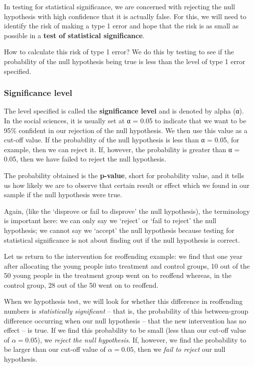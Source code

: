 \documentclass[
]{book}
\begin{document}
In testing for statistical significance, we are concerned with rejecting the null hypothesis with high confidence that it is actually false. For this, we will need to identify the risk of making a type 1 error and hope that the risk is as small as possible in a \textbf{test of statistical significance}.

How to calculate this risk of type 1 error? We do this by testing to see if the probability of the null hypothesis being true is less than the level of type 1 error specified.

\hypertarget{significance-level}{%
\subsubsection{Significance level}\label{significance-level}}

The level specified is called the \textbf{significance level} and is denoted by alpha (α). In the social sciences, it is usually set at α = 0.05 to indicate that we want to be 95\% confident in our rejection of the null hypothesis. We then use this value as a cut-off value. If the probability of the null hypothesis is less than α = 0.05, for example, then we can reject it. If, however, the probability is greater than α = 0.05, then we have failed to reject the null hypothesis.

The probability obtained is the \textbf{p-value}, short for probability value, and it tells us how likely we are to observe that certain result or effect which we found in our sample if the null hypothesis were true.

Again, (like the `disprove or fail to disprove' the null hypothesis), the terminology is important here: we can only say we `reject' or `fail to reject' the null hypothesis; we cannot say we `accept' the null hypothesis because testing for statistical significance is not about finding out if the null hypothesis is correct.

Let us return to the intervention for reoffending example: we find that one year after allocating the young people into treatment and control groups, 10 out of the 50 young people in the treatment group went on to reoffend whereas, in the control group, 28 out of the 50 went on to reoffend.

When we hypothesis test, we will look for whether this difference in reoffending numbers is \emph{statistically significant} -- that is, the probability of this between-group difference occurring when our null hypothesis -- that the new intervention has no effect -- is true. If we find this probability to be small (less than our cut-off value of \(\alpha = 0.05\)), we \emph{reject the null hypothesis}. If, however, we find the probability to be larger than our cut-off value of \(\alpha = 0.05\), then we \emph{fail to reject} our null hypothesis.
\end{document}
